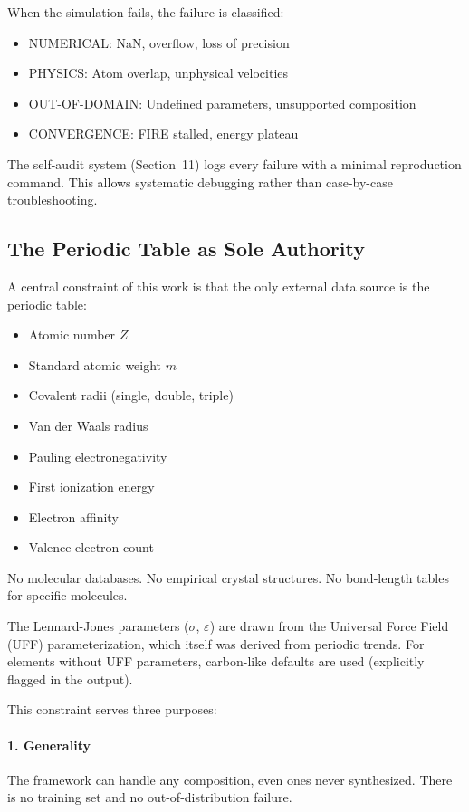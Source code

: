 \documentclass[11pt]{article}
\begin{document}
When the simulation fails, the failure is classified:
\begin{itemize}
\item NUMERICAL: NaN, overflow, loss of precision
\item PHYSICS: Atom overlap, unphysical velocities  
\item OUT-OF-DOMAIN: Undefined parameters, unsupported composition
\item CONVERGENCE: FIRE stalled, energy plateau
\end{itemize}

The self-audit system (Section~11) logs every failure with a minimal reproduction command. This allows systematic debugging rather than case-by-case troubleshooting.

\subsection{The Periodic Table as Sole Authority}

A central constraint of this work is that the only external data source is the periodic table:

\begin{itemize}
\item Atomic number $Z$
\item Standard atomic weight $m$
\item Covalent radii (single, double, triple)
\item Van der Waals radius
\item Pauling electronegativity
\item First ionization energy
\item Electron affinity
\item Valence electron count
\end{itemize}

No molecular databases. No empirical crystal structures. No bond-length tables for specific molecules.

The Lennard-Jones parameters ($\sigma$, $\varepsilon$) are drawn from the Universal Force Field (UFF) parameterization, which itself was derived from periodic trends. For elements without UFF parameters, carbon-like defaults are used (explicitly flagged in the output).

This constraint serves three purposes:

\paragraph{1. Generality} The framework can handle any composition, even ones never synthesized. There is no training set and no out-of-distribution failure.
\end{document}
